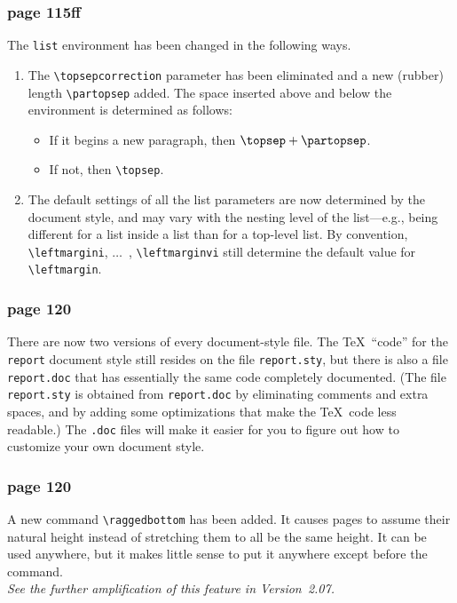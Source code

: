 \subsubsection*{page 115ff}
The \hbox{\verb"list"} environment has been changed in the
following ways.
\begin{enumerate}
\item The \hbox{\verb"\topsepcorrection"} parameter has been eliminated
and a new (rubber) length \hbox{\verb"\partopsep"} added.
The space inserted above and below the environment
is determined as follows:
\begin{itemize}
 \item If it begins a new paragraph, then 
       $\hbox{\verb"\topsep"}+\hbox{\verb"\partopsep"}$.
  \item If not, then \hbox{\verb"\topsep"}.
\end{itemize}

\item The default settings of all the list parameters are now
   determined by the document style, and may vary with the nesting level
   of the list---e.g., being different for a list inside a list than for
   a top-level list.  By convention, \hbox{\verb"\leftmargini"},
   $\ldots$~, \hbox{\verb"\leftmarginvi"} still determine the default
   value for \hbox{\verb"\leftmargin"}.
\end{enumerate}


\subsubsection*{page 120}
There are now two versions of every document-style file.  The \TeX\
``code'' for the \hbox{\verb"report"} document style still resides on
the file \hbox{\verb"report.sty"}, but there is also a file
\hbox{\verb"report.doc"} that has essentially the same code completely
documented.  (The file \hbox{\verb"report.sty"} is obtained from
\hbox{\verb"report.doc"} by eliminating comments and extra spaces, and
by adding some optimizations that make the \TeX\ code less readable.)
The \hbox{\verb".doc"} files will make it easier for you to figure out
how to customize your own document style.

\subsubsection*{page 120}
A new command \hbox{\verb"\raggedbottom"} has been added.  It causes
pages to assume their natural height instead of stretching them to all
be the same height.  It can be used anywhere, but it makes little
sense to put it anywhere except before the
\hbox{\verb""} command.\\
{\it See the further amplification of this feature in Version~2.07.}

